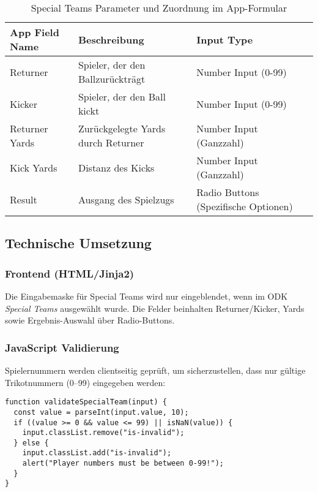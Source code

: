 \begin{table}[H]
\centering
\begin{tabular}{|l|l|p{6cm}|l|}
\hline
\textbf{App Field Name} & \textbf{Beschreibung} & \textbf{Input Type} \\
\hline
 Returner       & Spieler, der den
Ballzurückträgt &
Number Input (0-99) \\
 Kicker         & Spieler, der den Ball kickt & Number Input (0-99) \\
Returner Yards & Zurückgelegte Yards durch Returner & Number Input (Ganzzahl) \\
 Kick Yards     & Distanz des Kicks & Number Input (Ganzzahl) \\
 Result         & Ausgang des Spielzugs & Radio Buttons (Spezifische Optionen) \\
\hline
\end{tabular}
\caption{Special Teams Parameter und Zuordnung im App-Formular}
\end{table}

\subsection{Technische Umsetzung}

\subsubsection{Frontend (HTML/Jinja2)}

Die Eingabemaske für Special Teams wird nur eingeblendet, wenn im ODK \textit{Special Teams} ausgewählt wurde. Die Felder beinhalten Returner/Kicker, Yards sowie Ergebnis-Auswahl über Radio-Buttons.

\subsubsection{JavaScript Validierung}

Spielernummern werden clientseitig geprüft, um sicherzustellen, dass nur gültige Trikotnummern (0–99) eingegeben werden:

\begin{verbatim}
function validateSpecialTeam(input) {
  const value = parseInt(input.value, 10);
  if ((value >= 0 && value <= 99) || isNaN(value)) {
    input.classList.remove("is-invalid");
  } else {
    input.classList.add("is-invalid");
    alert("Player numbers must be between 0-99!");
  }
}
\end{verbatim}


